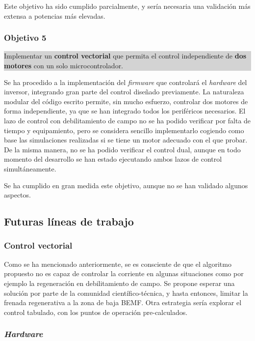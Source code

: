 Este objetivo ha sido cumplido parcialmente, y sería necesaria una validación más extensa a potencias más elevadas.

\subsubsection*{Objetivo 5}
\colorbox{lightgray}{%
	\parbox{\dimexpr\linewidth-2\fboxsep-2\fboxrule}{%
		Implementar un \textbf{control vectorial} que permita el control independiente de \textbf{dos motores} con un solo microcontrolador.%
	}%
}

Se ha procedido a la implementación del \textit{firmware} que controlará el \textit{hardware} del inversor, integrando gran parte del control diseñado previamente. La naturaleza modular del código escrito permite, sin mucho esfuerzo, controlar dos motores de forma independiente, ya que se han integrado todos los periféricos necesarios. El lazo de control con debilitamiento de campo no se ha podido verificar por falta de tiempo y equipamiento, pero se considera sencillo implementarlo cogiendo como base las simulaciones realizadas si se tiene un motor adecuado con el que probar. De la misma manera, no se ha podido verificar el control dual, aunque en todo momento del desarrollo se han estado ejecutando ambos lazos de control simultáneamente.

Se ha cumplido en gran medida este objetivo, aunque no se han validado algunos aspectos.


\subsection{Futuras líneas de trabajo}

\subsubsection{Control vectorial}

Como se ha mencionado anteriormente, se es consciente de que el algoritmo propuesto no es capaz de controlar la corriente en algunas situaciones como por ejemplo la regeneración en debilitamiento de campo. Se propone esperar una solución por parte de la comunidad científico-técnica, y hasta entonces, limitar la frenada regenerativa a la zona de baja BEMF. Otra estrategia sería explorar el control tabulado, con los puntos de operación pre-calculados.

\subsubsection{\textit{Hardware}}

